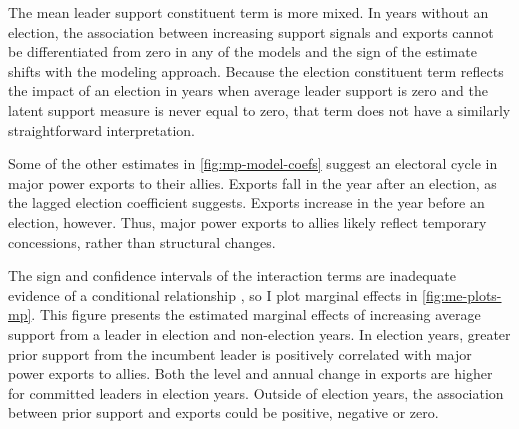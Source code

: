 \documentclass[12pt]{article}
\begin{document}
The mean leader support constituent term is more mixed.
In years without an election, the association between increasing support signals and exports cannot be differentiated from zero in any of the models and the sign of the estimate shifts with the modeling approach.
Because the election constituent term reflects the impact of an election in years when average leader support is zero and the latent support measure is never equal to zero, that term does not have a similarly straightforward interpretation. 


Some of the other estimates in \autoref{fig:mp-model-coefs} suggest an electoral cycle in major power exports to their allies.
Exports fall in the year after an election, as the lagged election coefficient suggests.
Exports increase in the year before an election, however. 
Thus, major power exports to allies likely reflect temporary concessions, rather than structural changes.


The sign and confidence intervals of the interaction terms are inadequate evidence of a conditional relationship \citep{BramborClarkGolder2006}, so I plot marginal effects in \autoref{fig:me-plots-mp}.
This figure presents the estimated marginal effects of increasing average support from a leader in election and non-election years.
In election years, greater prior support from the incumbent leader is positively correlated with major power exports to allies. 
Both the level and annual change in exports are higher for committed leaders in election years.
Outside of election years, the association between prior support and exports could be positive, negative or zero.
\end{document}
